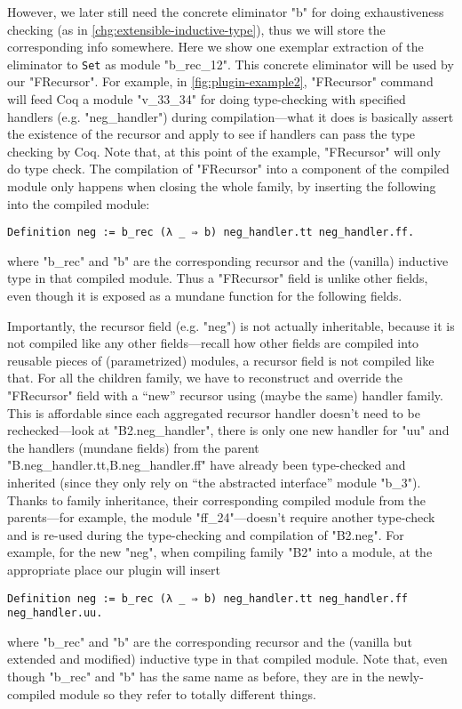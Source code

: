 However, we later still need the concrete eliminator "b" for doing exhaustiveness checking (as in \ref{chg:extensible-inductive-type}), thus we will store the corresponding info somewhere.  Here we show one exemplar extraction of the eliminator to \texttt{Set} as module "b_rec_12". This concrete eliminator will be used by our "FRecursor". For example, in \cref{fig:plugin-example2}, "FRecursor" command will feed Coq a module "v_33_34" for doing type-checking with specified handlers (e.g. "neg_handler") during compilation---what it does is basically
assert the existence of the recursor and apply to see if handlers can
pass the type checking by Coq. Note that, at this point of the example, "FRecursor" will only do type check. The compilation of "FRecursor" into a component of the compiled module only happens when closing the whole family, by inserting the following into the compiled module: 
\begin{verbatim}
Definition neg := b_rec (λ _ ⇒ b) neg_handler.tt neg_handler.ff.
\end{verbatim}
where "b_rec" and "b" are the corresponding recursor and the (vanilla) inductive type in that compiled module. Thus a "FRecursor" field is unlike other fields, even though it is exposed as a mundane function for the following fields.

Importantly, the recursor field (e.g. "neg") is not actually inheritable, because it is not compiled like any other fields---recall how other fields are compiled into reusable pieces of (parametrized) modules, a recursor field is not compiled like that. For all the children family, we have to reconstruct and override the "FRecursor" field with a ``new'' recursor using (maybe the same) handler family. This is affordable since each aggregated recursor handler doesn't need
to be rechecked---look at "B2.neg_handler", there is only one new
handler for "uu" and the handlers (mundane fields) from the parent
"B.neg_handler.tt,B.neg_handler.ff" have already been type-checked and
inherited (since they only rely on ``the abstracted
interface'' module "b_3"). 
Thanks to family inheritance, their corresponding compiled module from the parents---for example, 
the module "ff_24"---doesn't require another type-check and is re-used during the type-checking and compilation of "B2.neg". For example, for the new "neg", when compiling family "B2" into a module, at the appropriate place our plugin will insert
\begin{verbatim}
Definition neg := b_rec (λ _ ⇒ b) neg_handler.tt neg_handler.ff neg_handler.uu.
\end{verbatim}
where "b_rec" and "b" are the corresponding recursor and the (vanilla but extended and modified) inductive type in that compiled module. Note that, even though "b_rec" and "b" has the same name as before, they are in the newly-compiled module so they refer to totally different things. 





